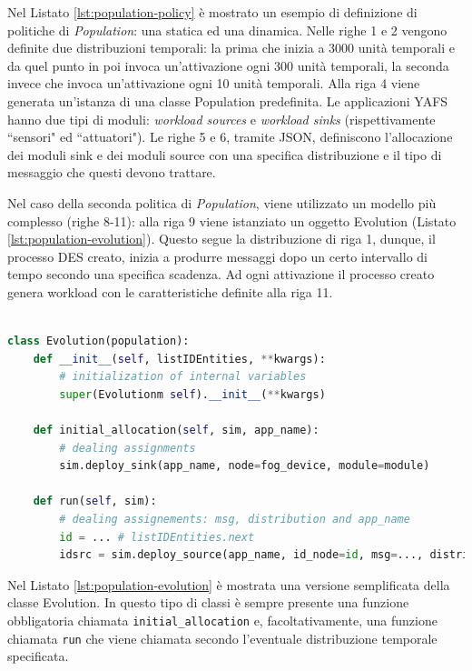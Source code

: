 Nel Listato \ref{lst:population-policy} è mostrato un esempio di definizione di politiche di \textit{Population}: una statica ed una dinamica. Nelle righe 1 e 2 vengono definite due distribuzioni temporali: la prima che inizia a 3000 unità temporali e da quel punto in poi invoca un'attivazione ogni 300 unità temporali, la seconda invece che invoca un'attivazione ogni 10 unità temporali. Alla riga 4 viene generata un'istanza di una classe Population predefinita. Le applicazioni YAFS hanno due tipi di moduli: \textit{workload sources} e \textit{workload sinks} (rispettivamente ``sensori" ed ``attuatori"). Le righe 5 e 6, tramite JSON, definiscono l'allocazione dei moduli sink e dei moduli source con una specifica distribuzione e il tipo di messaggio che questi devono trattare.

Nel caso della seconda politica di \textit{Population}, viene utilizzato un modello più complesso (righe 8-11): alla riga 9 viene istanziato un oggetto Evolution (Listato \ref{lst:population-evolution}). Questo segue la distribuzione di riga 1, dunque, il processo DES creato, inizia a produrre messaggi dopo un certo intervallo di tempo secondo una specifica scadenza. Ad ogni attivazione il processo creato genera workload con le caratteristiche definite alla riga 11.

\begin{lstlisting}[language=python, caption={Struttura di una classe Population \cite{YAFSSimulator}}, captionpos=b, label={lst:population-evolution}]

class Evolution(population):
	def __init__(self, listIDEntities, **kwargs):
		# initialization of internal variables
		super(Evolutionm self).__init__(**kwargs)
	
	def initial_allocation(self, sim, app_name):
		# dealing assignments
		sim.deploy_sink(app_name, node=fog_device, module=module)
	
	def run(self, sim):
		# dealing assignements: msg, distribution and app_name
		id = ... # listIDEntities.next
		idsrc = sim.deploy_source(app_name, id_node=id, msg=..., distribution=...)

\end{lstlisting}

Nel Listato \ref{lst:population-evolution} è mostrata una versione semplificata della classe Evolution. In questo tipo di classi è sempre presente una funzione obbligatoria chiamata \texttt{initial\_allocation} e, facoltativamente, una funzione chiamata \texttt{run} che viene chiamata secondo l'eventuale distribuzione temporale specificata.

